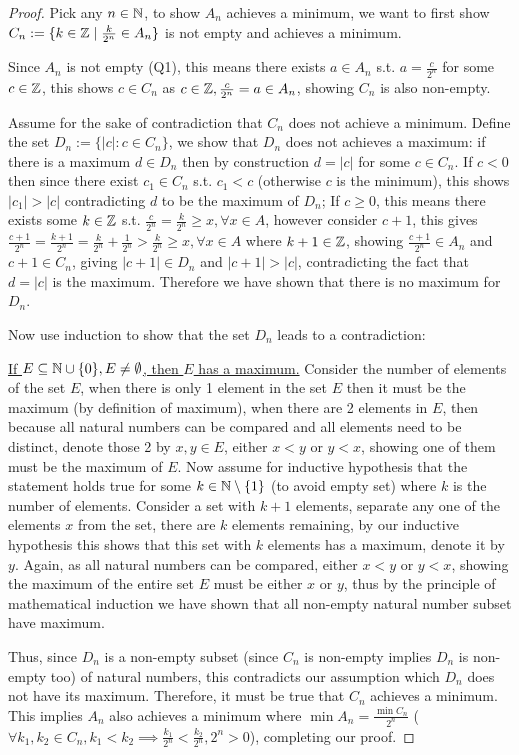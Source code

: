 \documentclass{homework}
\newcommand{\Z}{\bb{Z}} %
\newcommand{\N}{\bb{N}} %
\newcommand{\?}{\stackrel{?}{=}}
\theoremstyle{definition}
\begin{document}
\begin{proof}
    Pick any $n\in\N$, to show $A_n$ achieves a minimum, we want to first show $C_n:=\{k\in\Z\mid \frac{k}{2^n}\in A_n\}$ is not empty and achieves a minimum. 

    Since $A_n$ is not empty (Q1), this means there exists $a\in A_n$ s.t. $a=\frac{c}{2^n}$ for some $c\in\Z$, this shows $c\in C_n$ as $c\in\Z, \frac{c}{2^n}=a\in A_n$, showing $C_n$ is also non-empty.

    Assume for the sake of contradiction that $C_n$ does not achieve a minimum. Define the set $D_n :=\{|c|: c\in C_n\}$, we show that $D_n$ does not achieves a maximum: if there is a maximum $d\in D_n$ then by construction $d=|c|$ for some $c\in C_n$. If $c<0$ then since there exist $c_1\in C_n$ s.t. $c_1<c$ (otherwise $c$ is the minimum), this shows $|c_1|>|c|$ contradicting $d$ to be the maximum of $D_n$; If $c\geq0$, this means there exists some $k\in\Z$ s.t. $\frac{c}{2^n}=\frac{k}{2^n}\geq x, \forall x\in A$, however consider $c+1$, this gives $\frac{c+1}{2^n}=\frac{k+1}{2^n}=\frac{k}{2^n}+\frac1{2^n}>\frac{k}{2^n}\geq x, \forall x\in A$ where $k+1\in\Z$, showing $\frac{c+1}{2^n}\in A_n$ and $c+1\in C_n$, giving $|c+1|\in D_n$ and $|c+1|>|c|$, contradicting the fact that $d=|c|$ is the maximum. Therefore we have shown that there is no maximum for $D_n$. 

    Now use induction to show that the set $D_n$ leads to a contradiction:
    
    \underline{If $E\subseteq\N\cup\{0\}, E\neq\emptyset$, then $E$ has a maximum.} Consider the number of elements of the set $E$, when there is only 1 element in the set $E$ then it must be the maximum (by definition of maximum), when there are 2 elements in $E$, then because all natural numbers can be compared and all elements need to be distinct, denote those 2 by $x,y\in E$, either $x<y$ or $y<x$, showing one of them must be the maximum of $E$. Now assume for inductive hypothesis that the statement holds true for some $k\in\N\setminus\{1\}$ (to avoid empty set) where $k$ is the number of elements. Consider a set with $k+1$ elements, separate any one of the elements $x$ from the set, there are $k$ elements remaining, by our inductive hypothesis this shows that this set with $k$ elements has a maximum, denote it by $y$. Again, as all natural numbers can be compared, either $x<y$ or $y<x$, showing the maximum of the entire set $E$ must be either $x$ or $y$, thus by the principle of mathematical induction we have shown that all non-empty natural number subset have maximum.

    Thus, since $D_n$ is a non-empty subset (since $C_n$ is non-empty implies $D_n$ is non-empty too) of natural numbers, this contradicts our assumption which $D_n$ does not have its maximum. Therefore, it must be true that $C_n$ achieves a minimum. This implies $A_n$ also achieves a minimum where $\min A_n = \frac{\min C_n}{2^n}$ ($\forall k_1,k_2\in C_n, k_1<k_2\implies \frac{k_1}{2^n}<\frac{k_2}{2^n}, 2^n>0$), completing our proof.  
\end{proof}
\end{document}
